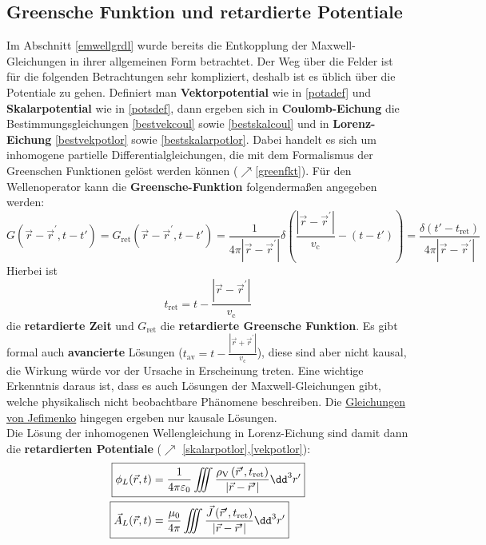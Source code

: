  \subsection{Greensche Funktion und retardierte Potentiale}
		  Im Abschnitt \ref{emwellgrdl} wurde bereits die Entkopplung der Maxwell-Gleichungen in ihrer allgemeinen Form betrachtet. Der Weg über die Felder ist für die folgenden Betrachtungen sehr kompliziert, deshalb ist es üblich über die Potentiale zu gehen. Definiert man \textbf{Vektorpotential} wie in \ref{potadef} und \textbf{Skalarpotential} wie in \ref{potsdef}, dann ergeben sich in \textbf{Coulomb-Eichung} die Bestimmungsgleichungen \ref{bestvekcoul} sowie \ref{bestskalcoul} und in \textbf{Lorenz-Eichung} \ref{bestvekpotlor} sowie \ref{bestskalarpotlor}. Dabei handelt es sich um inhomogene partielle Differentialgleichungen, die mit dem Formalismus der Greenschen Funktionen gelöst werden können ($\nearrow$\ref{greenfkt}).
		  Für den Wellenoperator kann die \textbf{Greensche-Funktion} folgendermaßen angegeben werden:
		  \begin{equation}\label{greenWell}
		  	\boxed{ G(\vec{r} -\vec{r}^\prime , t - t')=G_\mathrm{ret}(\vec{r} -\vec{r}^\prime , t - t') = \frac{1}{4\pi |\vec{r} -\vec{r}^\prime |}\delta\left(\frac{|\vec{r} -\vec{r}^\prime |}{ v_\mathrm{c}}-(t-t')\right) = \frac{\delta(t'-t_\mathrm{ret})}{4\pi |\vec{r} -\vec{r}^\prime |}}
		  \end{equation}
		  Hierbei ist 
		  \begin{equation}
		  	\boxed{t_\mathrm{ret} = t - \frac{|\vec{r} -\vec{r}^\prime |}{ v_\mathrm{c}}}
		  \end{equation} 
		  die \textbf{retardierte Zeit} und \(G_\mathrm{ret}\) die \textbf{retardierte Greensche Funktion}. Es gibt formal auch \textbf{avancierte} Lösungen ($t_\mathrm{av} = t - \frac{|\vec{r} +\vec{r}^\prime |}{ v_\mathrm{c}}$), diese sind aber nicht kausal, die Wirkung würde vor der Ursache in Erscheinung treten. Eine wichtige Erkenntnis daraus ist, dass es auch Lösungen der Maxwell-Gleichungen gibt, welche physikalisch nicht beobachtbare Phänomene beschreiben. Die \href{https://en.wikipedia.org/wiki/Jefimenko%27s_equations}{Gleichungen von Jefimenko} hingegen ergeben nur kausale Lösungen.\\
		   Die Lösung der inhomogenen Wellengleichung in Lorenz-Eichung sind damit dann die \textbf{retardierten Potentiale} ($\nearrow$ \ref{skalarpotlor},\ref{vekpotlor}):
		  \begin{align}
		  	\Aboxed{\phi_{{L}}(\vec{{r}}, {t})&=\frac{1}{4 \pi \varepsilon_{0}} \iiint \frac{\rho_\text{V}\left(\vec{{r}}^{\prime}, {t}_{\text{ret}}\right)}{\left|\vec{{r}}-\vec{{r}}^{\prime}\right|} \dd^3 {r}^{\prime}}\\
		  	\Aboxed{\vec{{A}}_{{L}}(\vec{{r}}, {t})&=\frac{\mu_{0}}{4 \pi} \iiint \frac{\vec{{J}}\left(\vec{{r}}^{\prime}, {t}_{\text{ret}}\right)}{\left|\vec{{r}}-\vec{{r}}^{\prime}\right|} \dd^3 {r}^{\prime}}
		  \end{align}
